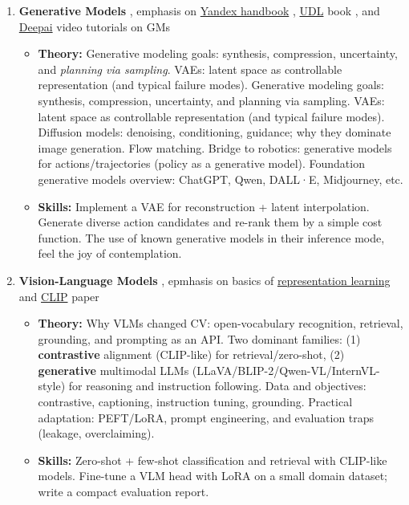 \documentclass[a4paper,11pt]{texMemo}
\begin{document}
\begin{enumerate}
\item \textbf{Generative Models}
\citep{YandexHandbookML,prince2023understanding, ho2020denoisingdiffusionprobabilisticmodels, diffusionpolicy2023}, emphasis on \href{https://education.yandex.ru/handbook/ml/article/vvedenie-v-generativnoe-modelirovanie}{Yandex handbook} \citep{YandexHandbookML}, \href{https://udlbook.github.io/udlbook/}{UDL} book \citep{prince2023understanding}, and \href{https://www.youtube.com/watch?v=qJeaCHQ1k2w}{Deepai} video tutorials on GMs
\begin{itemize}
    \item \textbf{Theory:}
    Generative modeling goals: synthesis, compression, uncertainty, and \emph{planning via sampling}.
    VAEs: latent space as controllable representation (and typical failure modes).
     Generative modeling goals: synthesis, compression, uncertainty, and planning via sampling. VAEs: latent space as controllable representation (and typical failure modes). Diffusion models: denoising, conditioning, guidance; why they dominate image generation. Flow matching. Bridge to robotics: generative models for actions/trajectories (policy as a generative model). Foundation generative models overview: ChatGPT, Qwen, DALL·E, Midjourney, etc.
    \item \textbf{Skills:}
    Implement a VAE for reconstruction + latent interpolation.
    Generate diverse action candidates and re-rank them by a simple cost function.
    The use of known generative models in their inference mode, feel the joy of contemplation. 
\end{itemize}

\item \textbf{Vision-Language Models}
\citep{radford2021learningtransferablevisualmodels, Alayrac2022, blip2_2023, llava_2023, qwen_vl_2023, internvl_2024, zhang2024visionlanguagemodelsvisiontasks, hu2021loralowrankadaptationlarge, prince2023understanding}, epmhasis on basics of  \href{https://education.yandex.ru/handbook/ml/article/obuchenie-predstavlenij}{representation learning} \citep{YandexHandbookML} and \href{https://arxiv.org/abs/2103.00020}{CLIP} paper \citep{radford2021learningtransferablevisualmodels}
\begin{itemize}
    \item \textbf{Theory:}
    Why VLMs changed CV: open-vocabulary recognition, retrieval, grounding, and prompting as an API.
    Two dominant families:
    (1) \textbf{contrastive} alignment (CLIP-like) for retrieval/zero-shot,
    (2) \textbf{generative} multimodal LLMs (LLaVA/BLIP-2/Qwen-VL/InternVL-style) for reasoning and instruction following.
    Data and objectives: contrastive, captioning, instruction tuning, grounding.
    Practical adaptation: PEFT/LoRA, prompt engineering, and evaluation traps (leakage, overclaiming).
    \item \textbf{Skills:}
    Zero-shot + few-shot classification and retrieval with CLIP-like models.
    Fine-tune a VLM head with LoRA on a small domain dataset; write a compact evaluation report.
\end{itemize}


\end{enumerate}
\end{document}
